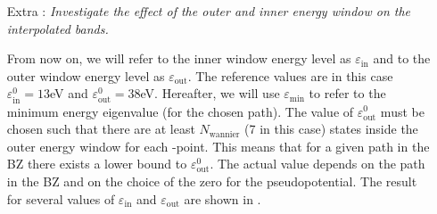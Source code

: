 \begin{enumerate}
	\item[Extra :] {\it Investigate the effect of the outer and inner energy window on the interpolated bands.}

	From now on, we will refer to the inner window energy level as $\varepsilon_{\mathrm{in}}$ and to the outer window energy level as $\varepsilon_{\mathrm{out}}$. The reference values are in this case $\varepsilon_{\mathrm{in}}^0 = 13$eV and $\varepsilon_{\mathrm{out}}^0 = 38$eV. Hereafter, we will use $\varepsilon_{\mathrm{min}}$ to refer to the minimum energy eigenvalue (for the chosen path). The value of $\varepsilon_{\mathrm{out}}^0$ must be chosen such that there are at least $N_{\mathrm{wannier}}$ (7 in this case) states inside the outer energy window for each \bfk-point. This means that for a given path in the BZ there exists a lower bound to $\varepsilon_{\mathrm{out}}^0$. The actual value depends on the path in the BZ and on the choice of the zero for the pseudopotential. The result for several values of $\varepsilon_{\mathrm{in}}$ and $\varepsilon_{\mathrm{out}}$ are shown in . 



\end{enumerate}
